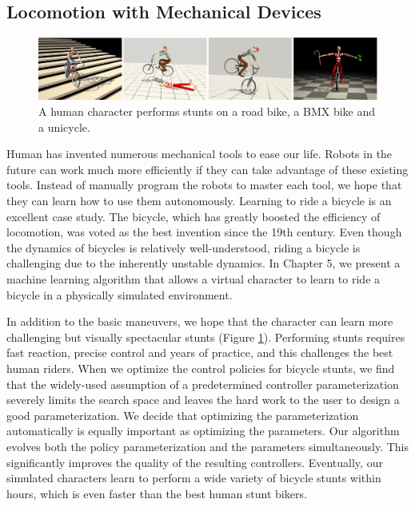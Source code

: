 \subsection{Locomotion with Mechanical Devices}

\begin{figure}[!h]
  \centering
    \includegraphics[width=\textwidth]{figures/teaserBicycle.eps}
  \caption{A human character performs stunts on a road bike, a BMX bike and a unicycle.}
  \label{fig:teaser3}
\end{figure}

Human has invented numerous mechanical tools to ease our life. Robots in the future can work much more efficiently if they can take advantage of these existing tools. Instead of manually program the robots to master each tool, we hope that they can learn how to use them autonomously. Learning to ride a bicycle is an excellent case study. The bicycle, which has greatly boosted the efficiency of locomotion, was voted as the best invention since the 19th century. Even though the dynamics of bicycles is relatively well-understood, riding a bicycle is challenging due to the inherently unstable dynamics. In Chapter 5, we present a machine learning algorithm that allows a virtual character to learn to ride a bicycle in a physically simulated environment. 

In addition to the basic maneuvers, we hope that the character can learn more challenging but visually spectacular stunts (Figure \ref{fig:teaser3}). Performing stunts requires fast reaction, precise control and years of practice, and this challenges the best human riders. When we optimize the control policies for bicycle stunts, we find that the widely-used assumption of a predetermined controller parameterization severely limits the search space and leaves the hard work to the user to design a good parameterization. We decide that optimizing the parameterization automatically is equally important as optimizing the parameters. Our algorithm evolves both the policy parameterization and the parameters simultaneously. This significantly improves the quality of the resulting controllers. Eventually, our simulated characters learn to perform a wide variety of bicycle stunts within hours, which is even faster than the best human stunt bikers.

